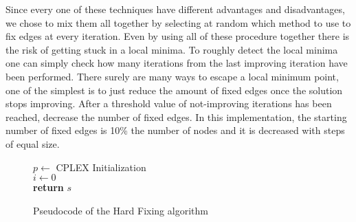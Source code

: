 Since every one of these techniques have different advantages and disadvantages, we chose to mix them all together by selecting at random which method to use to fix edges at every iteration.
Even by using all of these procedure together there is the risk of getting stuck in a local minima.
To roughly detect the local minima one can simply check how many iterations from the last improving iteration have been performed.
There surely are many ways to escape a local minimum point, one of the simplest is to just reduce the amount of fixed edges once the solution stops improving.
After a threshold value of not-improving iterations has been reached, decrease the number of fixed edges.
In this implementation, the starting number of fixed edges is 10\% the number of nodes and it is decreased with steps of equal size.
\begin{figure}[htbp]
	\begin{algorithm}[H]
		\vspace{2mm}
        $p \gets$ CPLEX Initialization \\
        $i \gets 0$ \\ 
        \textbf{return} $s$
	\end{algorithm}
	\caption{Pseudocode of the Hard Fixing algorithm} \label{fig:hardfix}
\end{figure}

